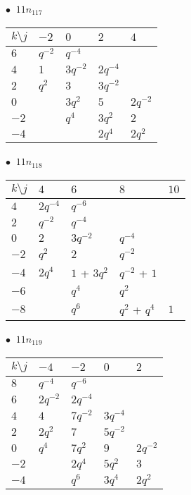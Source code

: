 %
\begin{minipage}{\linewidth}
$\bullet\ $ $11n_{117}$ \vspace{0.5em} \\
\begin{tabular}{l|llll}
$k \setminus j$ & $-2$ & $0$ & $2$ & $4$ \\
\hline
$6$ & $q^{-2}$ & $q^{-4}$ &  &  \\
$4$ & $1$ & $3q^{-2}$ & $2q^{-4}$ &  \\
$2$ & $q^{2}$ & $3$ & $3q^{-2}$ &  \\
$0$ &  & $3q^{2}$ & $5$ & $2q^{-2}$ \\
$-2$ &  & $q^{4}$ & $3q^{2}$ & $2$ \\
$-4$ &  &  & $2q^{4}$ & $2q^{2}$ \\
\end{tabular}
\vspace{2em}
\end{minipage}
%
\begin{minipage}{\linewidth}
$\bullet\ $ $11n_{118}$ \vspace{0.5em} \\
\begin{tabular}{l|llll}
$k \setminus j$ & $4$ & $6$ & $8$ & $10$ \\
\hline
$4$ & $2q^{-4}$ & $q^{-6}$ &  &  \\
$2$ & $q^{-2}$ & $q^{-4}$ &  &  \\
$0$ & $2$ & $3q^{-2}$ & $q^{-4}$ &  \\
$-2$ & $q^{2}$ & $2$ & $q^{-2}$ &  \\
$-4$ & $2q^{4}$ & $1$ + $3q^{2}$ & $q^{-2}$ + $1$ &  \\
$-6$ &  & $q^{4}$ & $q^{2}$ &  \\
$-8$ &  & $q^{6}$ & $q^{2}$ + $q^{4}$ & $1$ \\
\end{tabular}
\vspace{2em}
\end{minipage}
%
\begin{minipage}{\linewidth}
$\bullet\ $ $11n_{119}$ \vspace{0.5em} \\
\begin{tabular}{l|llll}
$k \setminus j$ & $-4$ & $-2$ & $0$ & $2$ \\
\hline
$8$ & $q^{-4}$ & $q^{-6}$ &  &  \\
$6$ & $2q^{-2}$ & $2q^{-4}$ &  &  \\
$4$ & $4$ & $7q^{-2}$ & $3q^{-4}$ &  \\
$2$ & $2q^{2}$ & $7$ & $5q^{-2}$ &  \\
$0$ & $q^{4}$ & $7q^{2}$ & $9$ & $2q^{-2}$ \\
$-2$ &  & $2q^{4}$ & $5q^{2}$ & $3$ \\
$-4$ &  & $q^{6}$ & $3q^{4}$ & $2q^{2}$ \\
\end{tabular}
\vspace{2em}
\end{minipage}
